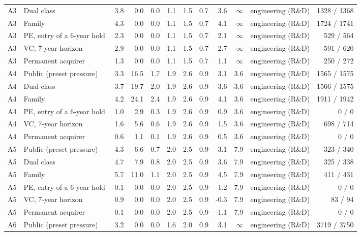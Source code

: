 \begin{table}[p]
\begin{tabular}{@{}llrrrrrrrrlr@{}}
A3 & Dual class & 3.8 & 0.0 & 0.0 & 1.1 & 1.5 & 0.7 & 3.6 & $\infty$ & engineering (R\&D) & 1328 / 1368 \\
A3 & Family & 4.3 & 0.0 & 0.0 & 1.1 & 1.5 & 0.7 & 4.1 & $\infty$ & engineering (R\&D) & 1724 / 1741 \\
A3 & PE, entry of a 6-year hold & 2.3 & 0.0 & 0.0 & 1.1 & 1.5 & 0.7 & 2.1 & $\infty$ & engineering (R\&D) & 529 / 564 \\
A3 & VC, 7-year horizon & 2.9 & 0.0 & 0.0 & 1.1 & 1.5 & 0.7 & 2.7 & $\infty$ & engineering (R\&D) & 591 / 620 \\
A3 & Permanent acquirer & 1.3 & 0.0 & 0.0 & 1.1 & 1.5 & 0.7 & 1.1 & $\infty$ & engineering (R\&D) & 250 / 272 \\
\addlinespace
A4 & Public (preset pressure) & 3.3 & 16.5 & 1.7 & 1.9 & 2.6 & 0.9 & 3.1 & 3.6 & engineering (R\&D) & 1565 / 1575 \\
A4 & Dual class & 3.7 & 19.7 & 2.0 & 1.9 & 2.6 & 0.9 & 3.6 & 3.6 & engineering (R\&D) & 1566 / 1575 \\
A4 & Family & 4.2 & 24.1 & 2.4 & 1.9 & 2.6 & 0.9 & 4.1 & 3.6 & engineering (R\&D) & 1911 / 1942 \\
A4 & PE, entry of a 6-year hold & 1.0 & 2.9 & 0.3 & 1.9 & 2.6 & 0.9 & 0.9 & 3.6 & engineering (R\&D) & 0 / 0 \\
A4 & VC, 7-year horizon & 1.6 & 5.6 & 0.6 & 1.9 & 2.6 & 0.9 & 1.5 & 3.6 & engineering (R\&D) & 698 / 714 \\
A4 & Permanent acquirer & 0.6 & 1.1 & 0.1 & 1.9 & 2.6 & 0.9 & 0.5 & 3.6 & engineering (R\&D) & 0 / 0 \\
\addlinespace
A5 & Public (preset pressure) & 4.3 & 6.6 & 0.7 & 2.0 & 2.5 & 0.9 & 3.1 & 7.9 & engineering (R\&D) & 323 / 340 \\
A5 & Dual class & 4.7 & 7.9 & 0.8 & 2.0 & 2.5 & 0.9 & 3.6 & 7.9 & engineering (R\&D) & 325 / 338 \\
A5 & Family & 5.7 & 11.0 & 1.1 & 2.0 & 2.5 & 0.9 & 4.5 & 7.9 & engineering (R\&D) & 411 / 431 \\
A5 & PE, entry of a 6-year hold & -0.1 & 0.0 & 0.0 & 2.0 & 2.5 & 0.9 & -1.2 & 7.9 & engineering (R\&D) & 0 / 0 \\
A5 & VC, 7-year horizon & 0.9 & 0.0 & 0.0 & 2.0 & 2.5 & 0.9 & -0.3 & 7.9 & engineering (R\&D) & 83 / 94 \\
A5 & Permanent acquirer & 0.1 & 0.0 & 0.0 & 2.0 & 2.5 & 0.9 & -1.1 & 7.9 & engineering (R\&D) & 0 / 0 \\
\addlinespace
A6 & Public (preset pressure) & 3.2 & 0.0 & 0.0 & 1.6 & 2.0 & 0.9 & 3.1 & $\infty$ & engineering (R\&D) & 3719 / 3750 \\

\end{tabular}
\end{table}
